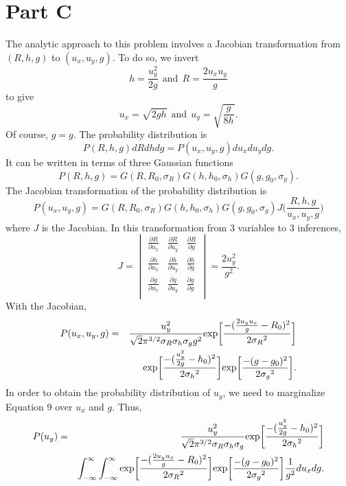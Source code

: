 \documentclass[12pt,a4paper]{article}
\begin{document}
\section{Part C}
\label{sec:partC}
The analytic approach to this problem involves a Jacobian transformation from $(R,h,g)$ to $(u_x,u_y,g)$. To do so, we invert 
\[ h=\frac{u_y^2}{2g} \ \ \textrm{and} 
\ \ R=\frac{2u_xu_y}{g} \] to give 
\[ u_x= \sqrt{2gh} \ \ \textrm{and} 
\ \ u_y=\sqrt{\frac{g}{8h}} .\]
Of course, $g=g$. The probability distribution is 
\begin{equation}
  P(R,h,g)dRdhdg=P(u_x,u_y,g)du_xdu_ydg.
\end{equation}
It can be written in terms of three Gaussian functions 
\begin{equation}
  P(R,h,g)=G(R,R_0,\sigma_R)G(h,h_0,\sigma_h)G(g,g_0,\sigma_g).
\end{equation}
The Jacobian transformation of the probability distribution is 
\begin{equation}
  P(u_x,u_y,g) = G(R,R_0,\sigma_R)G(h,h_0,\sigma_h)G(g,g_0,\sigma_g) J\bigg(\frac{R,h,g}{u_x,u_y,g}\bigg)
\end{equation}
where $J$ is the Jacobian. In this transformation from 3 variables to 3 inferences, 
\begin{equation}J=
\begin{vmatrix}
  \frac{\partial R}{\partial u_x} & \frac{\partial R}{\partial u_y} & \frac{\partial R}{\partial g}\\
  \frac{\partial h}{\partial u_x} & \frac{\partial h}{\partial u_y} & \frac{\partial h}{\partial g}\\
  \frac{\partial g}{\partial u_x} & \frac{\partial g}{\partial u_y} & \frac{\partial g}{\partial g}\\
\end{vmatrix}= \frac{2u_y^2}{g^2}. 
\end{equation}
With the Jacobian, 
\begin{eqnarray}\nonumber
P(u_x,u_y,g)&=& \frac{u_y^2}{\sqrt{2}\pi^{3/2} \sigma_R \sigma_h \sigma_g g^2}\textnormal{exp}\bigg[{\frac {-(\frac{2u_yu_x}{g}-R_0)^2}{2 {\sigma_R} ^2}}\bigg]\\
&& \textnormal{exp}\bigg[{\frac {-(\frac{u_y^2}{2g}-h_0)^2}{2 {\sigma_h} ^2}}\bigg]\textnormal{exp}\bigg[{\frac {-(g-g_0)^2}{2 {\sigma_g} ^2}}\bigg].
\end{eqnarray}
In order to obtain the probability distribution of $u_y$, we need to marginalize Equation 9 over $u_x$ and $g$. Thus, 
\begin{eqnarray}\nonumber
P(u_y)&=& \frac{u_y^2}{\sqrt{2}\pi^{3/2} \sigma_R \sigma_h \sigma_g}\textnormal{exp}\bigg[{\frac {-(\frac{u_y^2}{2g}-h_0)^2}{2 {\sigma_h} ^2}}\bigg]\\
&&\int_{-\infty}^{\infty}\int_{-\infty}^{\infty}\textnormal{exp}\bigg[{\frac {-(\frac{2u_yu_x}{g}-R_0)^2}{2 {\sigma_R} ^2}}\bigg]\textnormal{exp}\bigg[{\frac {-(g-g_0)^2}{2 {\sigma_g} ^2}}\bigg]\frac{1}{g^2}du_xdg. 
\end{eqnarray}
\end{document}
